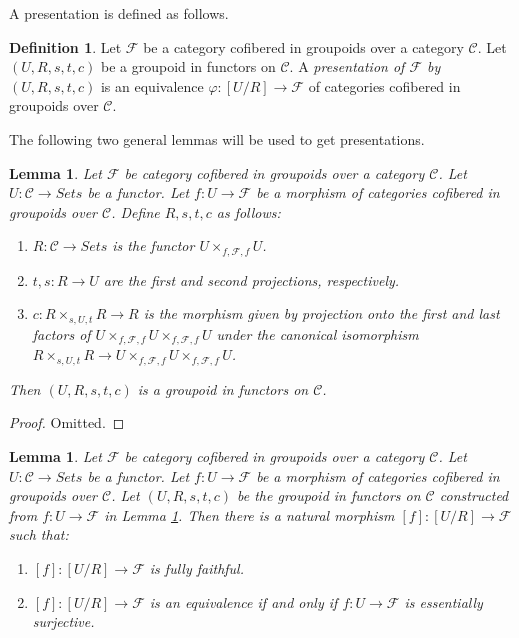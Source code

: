 \documentclass{stacks-project}
\theoremstyle{plain}
\newtheorem{lemma}[subsection]{Lemma}
\theoremstyle{definition}
\newtheorem{definition}[subsection]{Definition}
\theoremstyle{remark}
\numberwithin{equation}{subsection}
\begin{document}
\noindent
A presentation is defined as follows.

\begin{definition}
\label{definition-presentation}
Let $\mathcal{F}$ be a category cofibered in groupoids over a category
$\mathcal{C}$. Let $(U, R, s, t, c)$ be a groupoid in functors on
$\mathcal{C}$. A
{\it presentation of $\mathcal{F}$ by $(U, R, s, t, c)$} is an equivalence
$\varphi : [U/R] \to \mathcal{F}$ of categories cofibered in groupoids
over $\mathcal{C}$.
\end{definition}

\noindent
The following two general lemmas will be used to get presentations.

\begin{lemma}
\label{lemma-presentation-construction}
Let $\mathcal{F}$ be category cofibered in groupoids over a category
$\mathcal{C}$. Let $U : \mathcal{C} \to \textit{Sets}$ be a functor.
Let $f : U \to \mathcal{F}$ be a morphism of categories cofibered in groupoids
over $\mathcal{C}$. Define $R, s, t, c$ as follows:
\begin{enumerate}
\item $R : \mathcal{C} \to \textit{Sets}$ is the functor
$U \times_{f, \mathcal{F}, f} U$.
\item $t, s : R \to U$ are the first and second projections,
respectively.
\item $c : R \times_{s, U, t} R \to R$ is the morphism given by projection
onto the first and last factors of
$U \times_{f, \mathcal{F}, f} U \times_{f, \mathcal{F}, f} U$
under the canonical isomorphism
$R \times_{s, U, t} R \to
U \times_{f, \mathcal{F}, f} U \times_{f, \mathcal{F}, f} U$.
\end{enumerate}
Then $(U, R, s, t, c)$ is a groupoid in functors on $\mathcal{C}$.
\end{lemma}

\begin{proof}
Omitted.
\end{proof}

\begin{lemma}
\label{lemma-presentation-morphism}
Let $\mathcal{F}$ be category cofibered in groupoids over a category
$\mathcal{C}$. Let $U : \mathcal{C} \to \textit{Sets}$ be a functor.
Let $f : U \to \mathcal{F}$ be a morphism of categories cofibered in groupoids
over $\mathcal{C}$. Let $(U, R, s, t, c)$ be the groupoid in functors on
$\mathcal{C}$ constructed from $f : U \to \mathcal{F}$ in
Lemma \ref{lemma-presentation-construction}.
Then there is a natural morphism $[f] : [U/R] \to \mathcal{F}$ such that:
\begin{enumerate}
\item $[f]: [U/R] \to \mathcal{F}$ is fully faithful.
\item $[f]: [U/R] \to \mathcal{F}$ is an equivalence if and only if
$f : U \to \mathcal{F}$ is essentially surjective.
\end{enumerate}
\end{lemma}
\end{document}
